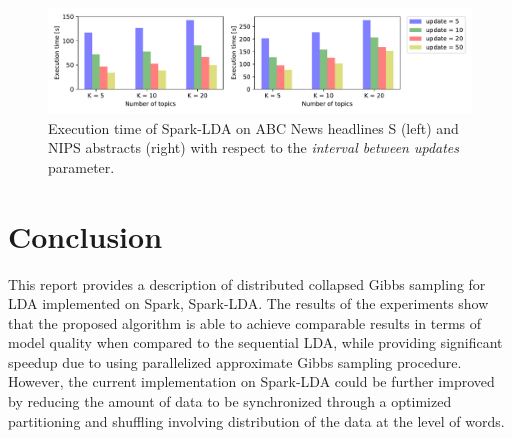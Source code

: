 \documentclass[journal]{IEEEtran}
\begin{document}
\begin{figure}[t]
\centering
\includegraphics[scale=0.6]{plots/param_update.pdf}
\caption{Execution time of Spark-LDA on ABC News headlines S (left) and NIPS abstracts (right) with respect to the \textit{interval between updates} parameter.}
\label{fig:update-time}
\end{figure}



\section{Conclusion}
\label{sec:conclusion}
This report provides a description of distributed collapsed Gibbs sampling for LDA implemented on Spark, Spark-LDA. The results of the experiments show that the proposed algorithm is able to achieve comparable results in terms of model quality when compared to the sequential LDA, while providing significant speedup due to using parallelized approximate Gibbs sampling procedure. However, the current implementation on Spark-LDA could be further improved by reducing the amount of data to be synchronized through a optimized partitioning and shuffling involving distribution of the data at the level of words.



\end{document}
